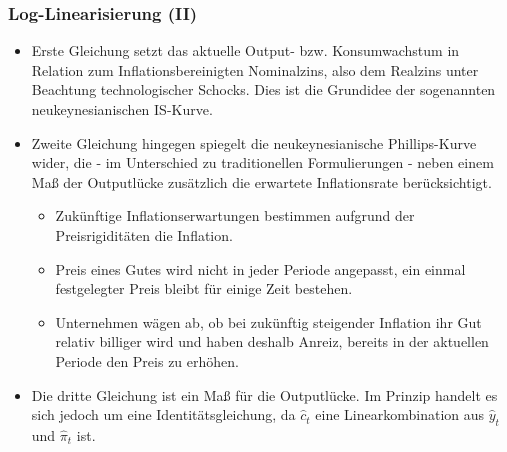 \documentclass[10pt]{beamer}  %
\begin{document}
\begin{frame}\frametitle{Log-Linearisierung (II)}\small
\begin{itemize}
\item Erste Gleichung setzt das aktuelle Output- bzw. Konsumwachstum in Relation zum Inflationsbereinigten Nominalzins, also dem Realzins unter Beachtung technologischer Schocks. Dies ist die Grundidee der sogenannten neukeynesianischen IS-Kurve.
\item Zweite Gleichung hingegen spiegelt die neukeynesianische Phillips-Kurve wider, die - im Unterschied zu traditionellen Formulierungen - neben einem Ma{\ss} der Outputl\"{u}cke zus\"{a}tzlich die erwartete Inflationsrate ber\"{u}cksichtigt.
    \begin{itemize}\footnotesize
    \item Zuk\"{u}nftige Inflationserwartungen bestimmen aufgrund der Preisrigidit\"{a}ten die Inflation.
    \item Preis eines Gutes wird nicht in jeder Periode angepasst, ein einmal festgelegter Preis bleibt f\"{u}r einige Zeit bestehen.
    \item Unternehmen w\"{a}gen ab, ob bei zuk\"{u}nftig steigender Inflation ihr Gut relativ billiger wird und haben deshalb Anreiz, bereits in der aktuellen Periode den Preis zu erh\"{o}hen.
    \end{itemize}
\item Die dritte Gleichung ist ein Ma{\ss} f\"{u}r die Outputl\"{u}cke. Im Prinzip handelt es sich jedoch um eine Identit\"{a}tsgleichung, da $\widehat{c}_t$ eine Linearkombination aus $\widehat{y}_t$ und $\widehat{\pi}_t$ ist.
\end{itemize}
\end{frame}
\end{document}
